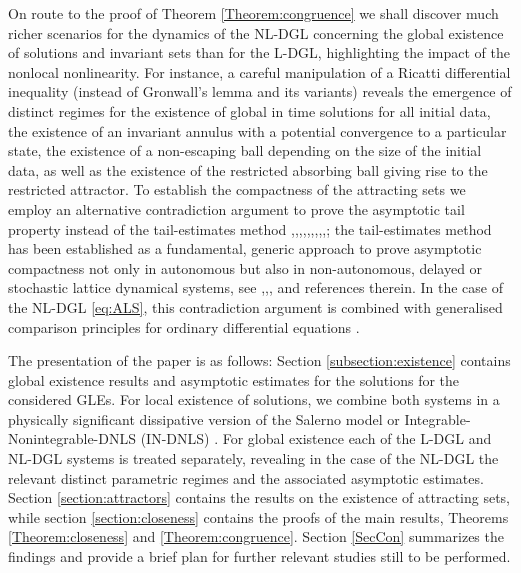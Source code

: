 \documentclass[preprintnumbers,amsmath,amssymb]{revtex4}
\begin{document}
On route to the proof of Theorem \ref{Theorem:congruence} we shall discover much richer scenarios for the dynamics of the NL-DGL concerning the global existence of solutions and invariant sets than for the L-DGL, highlighting the impact of the nonlocal nonlinearity. For instance, a careful manipulation of a Ricatti differential inequality (instead of  Gronwall's lemma and its variants) reveals the emergence of distinct regimes for the existence of global in time solutions for all initial data, the existence of an invariant annulus with a potential convergence to a particular state, the existence of a non-escaping ball depending on the size of the initial data, as well as the existence of the restricted absorbing ball giving rise to the restricted attractor. To establish the compactness of the attracting sets we employ an alternative contradiction argument to prove the asymptotic tail property instead of the tail-estimates method \cite{Bates},\cite{Zhou0},\cite{Zhou},\cite{Zhou1},\cite{Zhou3},\cite{Wang},\cite{Zhou2},\cite{Nikos},\cite{NAE2007},\cite{Du}; the tail-estimates method has been established as  a fundamental, generic approach to prove asymptotic compactness not only in autonomous but also in non-autonomous, delayed  or stochastic lattice dynamical systems, see \cite{Stoch1},\cite{Stoch2},\cite{Stoch3},\cite{Stoch4} and references therein. In the case of the NL-DGL \eqref{eq:ALS}, this contradiction argument is combined with generalised comparison principles for ordinary differential equations \cite{McNabb1986}.
 
The presentation of the paper is as follows:  Section  \ref{subsection:existence} contains global existence results and asymptotic estimates for the solutions for the considered GLEs. For local existence of solutions, we combine both systems in a physically significant dissipative version of the Salerno model \cite{Salerno} or Integrable-Nonintegrable-DNLS (IN-DNLS) \cite{Cai94}. For global existence each of the L-DGL and NL-DGL systems is treated separately, revealing in the case of the NL-DGL the relevant distinct parametric regimes and the associated asymptotic estimates.  Section \ref {section:attractors} contains the results on the existence of attracting sets, while section \ref{section:closeness} contains the proofs of the main results, Theorems \ref{Theorem:closeness} and \ref{Theorem:congruence}. Section \ref{SecCon} summarizes the findings and provide a brief  plan for further relevant studies still to be  performed.
\end{document}
